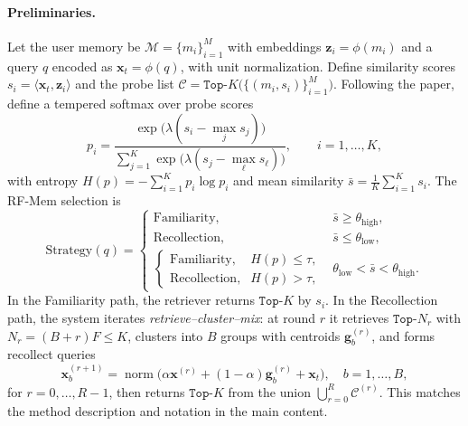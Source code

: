 \paragraph{Preliminaries.}
Let the user memory be $\mathcal{M}=\{m_i\}_{i=1}^M$ with embeddings $\mathbf{z}_i=\phi(m_i)$ and a query $q$ encoded as $\mathbf{x}_t=\phi(q)$, with unit normalization.
Define similarity scores $s_i=\langle \mathbf{x}_t,\mathbf{z}_i\rangle$ and the probe list $\mathcal{C}=\texttt{Top-}K\big(\{(m_i,s_i)\}_{i=1}^M\big)$.
Following the paper, define a tempered softmax over probe scores
\begin{equation}
p_i=\frac{\exp\!\big(\lambda(s_i-\max_j s_j)\big)}{\sum_{j=1}^K \exp\!\big(\lambda(s_j-\max_\ell s_\ell)\big)},\qquad i=1,\dots,K,
\end{equation}
with entropy $H(p)=-\sum_{i=1}^K p_i\log p_i$ and mean similarity $\bar{s}=\frac{1}{K}\sum_{i=1}^K s_i$.
The RF-Mem selection is
\begin{equation}
\text{Strategy}(q) =
\begin{cases}
\text{Familiarity}, & \bar{s} \geq \theta_{\text{high}}, \\[6pt]
\text{Recollection}, & \bar{s} \leq \theta_{\text{low}}, \\[6pt]
\begin{cases}
\text{Familiarity}, & H(p) \leq \tau, \\
\text{Recollection}, & H(p) > \tau,
\end{cases} & \theta_{\text{low}} < \bar{s} < \theta_{\text{high}}.
\end{cases}
\label{eq:gate}
\end{equation}
In the Familiarity path, the retriever returns $\texttt{Top-}K$ by $s_i$.
In the Recollection path, the system iterates \emph{retrieve–cluster–mix}: at round $r$ it retrieves $\texttt{Top-}N_r$ with $N_r=(B+r)F\le K$, clusters into $B$ groups with centroids $\mathbf{g}^{(r)}_b$, and forms recollect queries
\begin{equation}
\mathbf{x}^{(r+1)}_b=\operatorname{norm}\big(\alpha \mathbf{x}^{(r)}+(1-\alpha)\mathbf{g}^{(r)}_b+\mathbf{x}_t\big),\quad b=1,\dots,B,
\end{equation}
for $r=0,\dots,R-1$, then returns $\texttt{Top-}K$ from the union $\bigcup_{r=0}^R \mathcal{C}^{(r)}$.
This matches the method description and notation in the main content.

